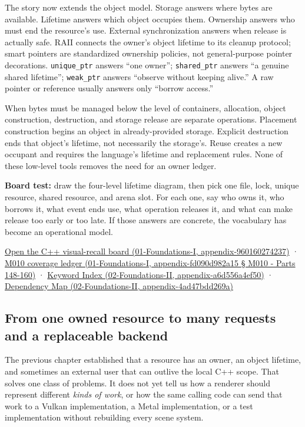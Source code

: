 The story now extends the object model. Storage answers where bytes are available. Lifetime answers which object occupies them. Ownership answers who must end the resource's use. External synchronization answers when release is actually safe. RAII connects the owner's object lifetime to its cleanup protocol; smart pointers are standardized ownership policies, not general-purpose pointer decorations. \texttt{unique\_ptr} answers ``one owner''; \texttt{shared\_ptr} answers ``a genuine shared lifetime''; \texttt{weak\_ptr} answers ``observe without keeping alive.'' A raw pointer or reference usually answers only ``borrow access.''

When bytes must be managed below the level of containers, allocation, object construction, destruction, and storage release are separate operations. Placement construction begins an object in already-provided storage. Explicit destruction ends that object's lifetime, not necessarily the storage's. Reuse creates a new occupant and requires the language's lifetime and replacement rules. None of these low-level tools removes the need for an owner ledger.

\textbf{Board test:} draw the four-level lifetime diagram, then pick one file, lock, unique resource, shared resource, and arena slot. For each one, say who owns it, who borrows it, what event ends use, what operation releases it, and what can make release too early or too late. If those answers are concrete, the vocabulary has become an operational model.

\href{}{Open the C++ visual-recall board (01-Foundations-I, appendix-960160274237)} · \href{}{M010 coverage ledger (01-Foundations-I, appendix-fd090d982a15 § M010 - Parts 148-160)} · \href{}{Keyword Index (02-Foundations-II, appendix-a6d556a4ef50)} · \href{}{Dependency Map (02-Foundations-II, appendix-4ad47bdd269a)}

\subsection{From one owned resource to many requests and a replaceable backend}\label{from-one-owned-resource-to-many-requests-and-a-replaceable-backend}

The previous chapter established that a resource has an owner, an object lifetime, and sometimes an external user that can outlive the local C++ scope. That solves one class of problems. It does not yet tell us how a renderer should represent different \emph{kinds of work}, or how the same calling code can send that work to a Vulkan implementation, a Metal implementation, or a test implementation without rebuilding every scene system.

